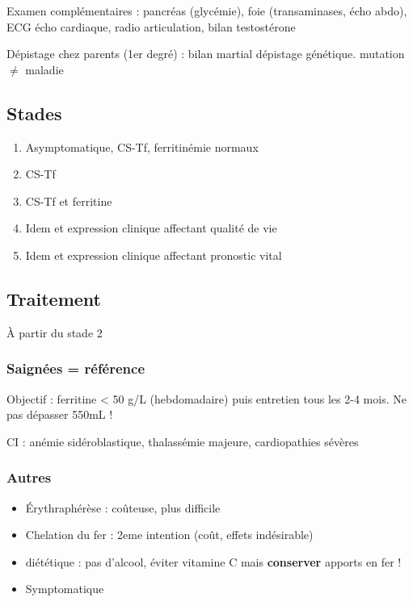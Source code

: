 \documentclass[11pt]{article}
\begin{document}
Examen complémentaires : pancréas (glycémie),  foie (transaminases, écho abdo), ECG \textpm{} écho
cardiaque, radio articulation, bilan testostérone

Dépistage chez parents (1er degré) : bilan martial \textpm{} dépistage génétique. \danger mutation \(\neq\) maladie

\subsection{Stades}
\label{sec:org675a595}
\begin{enumerate}
\item Asymptomatique, CS-Tf, ferritinémie normaux
\item CS-Tf \inc
\item CS-Tf \inc et ferritine \inc
\item Idem et expression clinique affectant qualité de vie
\item Idem et expression clinique affectant pronostic vital
\end{enumerate}

\subsection{Traitement}
\label{sec:org62fd6b2}
À partir du stade 2

\subsubsection{Saignées = référence}
\label{sec:orged086a8}
Objectif : ferritine < 50 g/L (hebdomadaire) puis entretien tous les
  2-4 mois. Ne pas dépasser 550mL !

CI : anémie sidéroblastique, thalassémie majeure, cardiopathies sévères

\subsubsection{Autres}
\label{sec:org9123517}
\begin{itemize}
\item Érythraphérèse : coûteuse, plus difficile
\item Chelation du fer : 2eme intention (coût, effets indésirable)
\item diététique : pas d'alcool, éviter vitamine C mais \textbf{conserver} apports en fer !
\item Symptomatique
\end{itemize}
\end{document}
